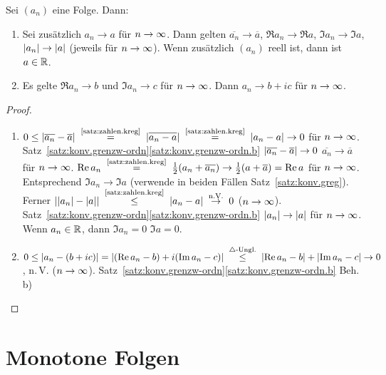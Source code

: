 \documentclass[12pt]{scrreprt}
\begin{document}
\begin{satz}
  \label{satz:konv.grenzw-komplex}
  Sei $(a_n)$ eine Folge. Dann:
  \begin{enumerate}
  \item Sei zusätzlich $a_n\to a$ für $n\rightarrow\infty$. Dann gelten
    $\overline{a_n}\to\overline{a}$, $\Re{a_n}\to\Re{a}$,
    $\Im{a_n}\to\Im{a}$, $\left\lvert a_n\right\lvert\to\left\lvert a\right\lvert$ (jeweils für
    $n\rightarrow\infty$). Wenn zusätzlich $(a_n)$ reell ist, dann ist $a\in\mathbb{R}$.
  \item Es gelte $\Re{a_n}\to b$ und $\Im{a_n}\to c$ für $n\rightarrow\infty$. Dann
    $a_n\to b+ic$ für $n\rightarrow\infty$.
  \end{enumerate}
\end{satz}
\begin{proof}
  \begin{enumerate}
  \item $0\le\abs{\overline{a_n}-\overline{a}}
    \nach{=}{\ref{satz:zahlen.kreg}} \abs{\overline{a_n-a}}
    \nach{=}{\ref{satz:zahlen.kreg}} \abs{a_n-a}\to0$ für
    $n\rightarrow\infty$. Satz~\ref{satz:konv.grenzw-ordn}\ref{satz:konv.grenzw-ordn.b}
    \folgt $\left\lvert\overline{a_n}-\overline{a}\right\lvert\to0$ \folgt
    $\overline{a_n}\to\overline{a}$ für $n\rightarrow\infty$. \folgt $\Re{a_n}
    \nach{=}{\ref{satz:zahlen.kreg}}
    \frac12(a_n+\overline{a_n})\to\frac12(a+\overline{a})=\Re{a}$ für
    $n\rightarrow\infty$. Entsprechend $\Im{a_n}\to\Im{a}$ (verwende in beiden
    Fällen Satz~\ref{satz:konv.greg}). Ferner $\abs{\abs{a_n}-\abs{a}}
    \nach{\le}{\ref{satz:zahlen.kreg}} |a_n-a| \nach{\ra}{n.V.} 0$
    ($n\rightarrow\infty$). Satz~\ref{satz:konv.grenzw-ordn}\ref{satz:konv.grenzw-ordn.b}
    \folgt $\left\lvert a_n\right\lvert\to\left\lvert a\right\lvert$ für $n\rightarrow\infty$. Wenn $a_n\in\mathbb{R}$, dann
    $\Im{a_n}=0$ \folgt $\Im{a}=0$.
  \item $0\le\abs{a_n-(b+ic)}=\abs{(\Re{a_n}-b)+i(\Im{a_n}-c)}
    \nach{\le}{$\triangle$-Ungl.}
    \abs{\Re{a_n}-b}+\abs{\Im{a_n}-c}\to0$,
    n.\,V. ($n\rightarrow\infty$). Satz~\ref{satz:konv.grenzw-ordn}\ref{satz:konv.grenzw-ordn.b}
    \folgt Beh. b)
  \end{enumerate}
\end{proof}

\section{Monotone Folgen}
\label{sec:konv.folge-monoton}
\end{document}
